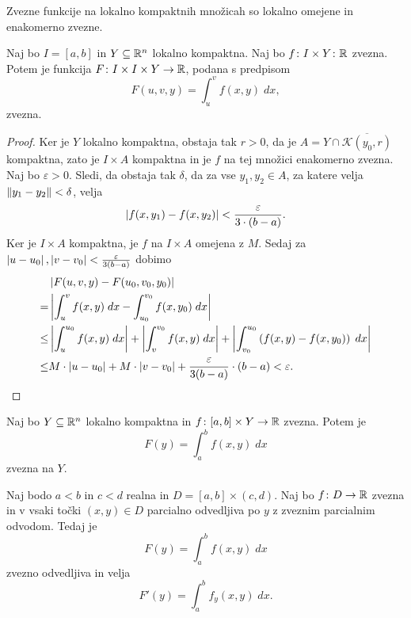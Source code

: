 \begin{opomba}
Zvezne funkcije na lokalno kompaktnih množicah so lokalno omejene in enakomerno zvezne.
\end{opomba}

\begin{izrek}
Naj bo $I = [a,b]$ in $Y \subseteq \mathbb{R}^n$ lokalno kompaktna. Naj bo
$f \colon I \times Y \colon \mathbb{R}$ zvezna. Potem je funkcija
$F \colon I \times I \times Y \to \mathbb{R}$, podana s predpisom
\[
F(u,v,y) = \int_u^v f(x,y)\;dx,
\]
zvezna.
\end{izrek}

\begin{proof}
Ker je $Y$ lokalno kompaktna, obstaja tak $r>0$, da je
$A = Y \cap \overline{\mathcal{K}(y_0,r)}$ kompaktna, zato je
$I \times A$ kompaktna in je $f$ na tej množici enakomerno zvezna.
Naj bo $\varepsilon > 0$. Sledi, da obstaja tak $\delta$, da za vse
$y_1,y_2 \in A$, za katere velja $\left\lVert y_1 - y_2\right\rVert < \delta$, velja
\[
\left\lvert f(x,y_1) - f(x,y_2)\right\rvert < \frac{\varepsilon}{3 \cdot (b-a)}.
\]
Ker je $I \times A$ kompaktna, je $f$ na $I \times A$ omejena z
$M$. Sedaj za
$\left\lvert u-u_0\right\rvert,\left\lvert v-v_0\right\rvert < \frac{\varepsilon}{3(b-a)}$ dobimo
\begin{align*}
&\left\lvert F(u,v,y) - F(u_0,v_0,y_0)\right\rvert
\\
= &\left\lvert \int_u^v f(x,y)\;dx - \int_{u_0}^{v_0} f(x,y_0)\;dx\right\rvert
\\
\leq &\left\lvert \int_u^{u_0} f(x,y)\;dx\right\rvert +
\left\lvert \int_v^{v_0} f(x,y)\;dx\right\rvert +
\left\lvert \int_{v_0}^{u_0} \left(f(x,y) - f(x,y_0)\right)\;dx\right\rvert
\\
\leq &M \cdot \left\lvert u-u_0\right\rvert + M \cdot \left\lvert v-v_0\right\rvert +
\frac{\varepsilon}{3(b-a)} \cdot (b-a) < \varepsilon. \qedhere
\end{align*}
\end{proof}

\begin{posledica}
Naj bo $Y \subseteq \mathbb{R}^n$ lokalno kompaktna in
$f \colon [a,b] \times Y \to \mathbb{R}$ zvezna. Potem je
\[
F(y) = \int_a^b f(x,y)\;dx
\]
zvezna na $Y$.
\end{posledica}

\begin{izrek}\label{iz:odv_int}
Naj bodo $a<b$ in $c<d$ realna in $D = [a,b] \times (c,d)$. Naj bo
$f \colon D \to \mathbb{R}$ zvezna in v vsaki točki $(x,y) \in D$ parcialno
odvedljiva po $y$ z zveznim parcialnim odvodom. Tedaj je
\[
F(y) = \int_a^b f(x,y)\;dx
\]
zvezno odvedljiva in velja
\[
F'(y) = \int_a^b f_y(x,y)\;dx.
\]
\end{izrek}

